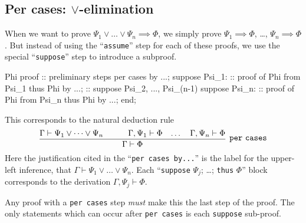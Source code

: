 {\subsection{Per cases: $\lor$-elimination}
When we want to prove $\Psi_{1}\lor\dots\lor\Psi_{n}\implies \Phi$,
we simply prove $\Psi_{1}\implies\Phi$, \dots, $\Psi_{n}\implies\Phi$.
But instead of using the ``\lstinline{assume}'' step for each of these
proofs, we use the special ``\lstinline{suppose}'' step to introduce a
subproof.
\begin{mizar}
Phi
proof
  :: preliminary steps
  per cases by ...;
  suppose Psi_1:
    :: proof of Phi from Psi_1
    thus Phi by ...;
  :: suppose Psi_2, ..., Psi_(n-1)
  suppose Psi_n:
    :: proof of Phi from Psi_n
    thus Phi by ...;
end;
\end{mizar}%
This corresponds to the natural deduction rule
\begin{equation}
  \vcenter{\infer[\mathtt{per~cases}]{\Gamma\vdash \Phi}{%
    \Gamma\vdash\Psi_{1}\lor\dots\lor\Psi_{n}
    & \qquad\Gamma,\Psi_{1}\vdash\Phi
    & \dots
    & \Gamma,\Psi_{n}\vdash\Phi}}
\end{equation}
Here the justification cited in the ``\lstinline{per cases by...}'' is the
label for the upper-left inference, that $\Gamma\vdash\Psi_{1}\lor\dots\lor\Psi_{n}$.
Each ``\lstinline{suppose} $\Psi_{j}$; \dots; \lstinline{thus} $\Phi$'' block
corresponds to the derivation $\Gamma,\Psi_{j}\vdash\Phi$.

\begin{danger}
  Any proof with a \lstinline{per cases} step \emph{must} make this the
  last step of the proof. The only statements which can occur after
  \lstinline{per cases} is each \lstinline{suppose} sub-proof.
\end{danger}

}

